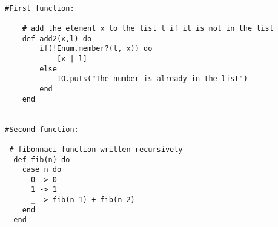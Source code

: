 \documentclass[a4paper,11pt]{article}
\begin{document}
\begin{verbatim}

#First function:

    # add the element x to the list l if it is not in the list 
    def add2(x,l) do
        if(!Enum.member?(l, x)) do
            [x | l]
        else
            IO.puts("The number is already in the list")
        end
    end
  

#Second function:

 # fibonnaci function written recursively
  def fib(n) do
    case n do
      0 -> 0
      1 -> 1
      _ -> fib(n-1) + fib(n-2)
    end
  end
  
 \end{verbatim}
\end{document}
